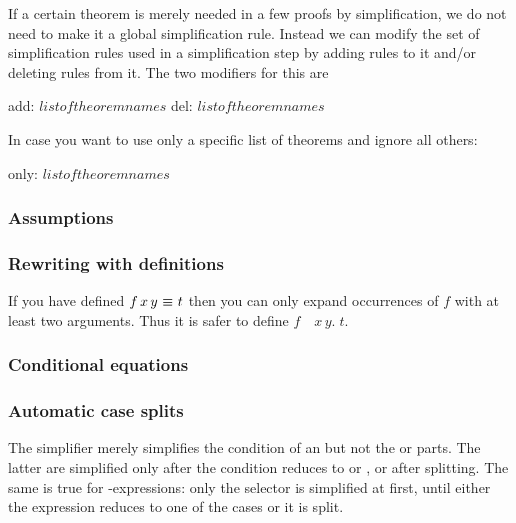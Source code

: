 If a certain theorem is merely needed in a few proofs by simplification,
we do not need to make it a global simplification rule. Instead we can modify
the set of simplification rules used in a simplification step by adding rules
to it and/or deleting rules from it. The two modifiers for this are
\begin{ttbox}
add: \(list of theorem names\)
del: \(list of theorem names\)
\end{ttbox}
In case you want to use only a specific list of theorems and ignore all
others:
\begin{ttbox}
only: \(list of theorem names\)
\end{ttbox}


\subsubsection{Assumptions}

{\makeatother}

\subsubsection{Rewriting with definitions}



\begin{warn}
  If you have defined $f\,x\,y~\emph{$\equiv$}~t$ then you can only expand
  occurrences of $f$ with at least two arguments. Thus it is safer to define
  $f$~\isasymequiv~\isasymlambda$x\,y.\;t$.
\end{warn}



\subsubsection{Conditional equations}




\subsubsection{Automatic case splits}

{\makeatother}

\begin{warn}
  The simplifier merely simplifies the condition of an  but not the
   or  parts. The latter are simplified only after the
  condition reduces to  or , or after splitting. The
  same is true for -expressions: only the selector is
  simplified at first, until either the expression reduces to one of the
  cases or it is split.
\end{warn}

